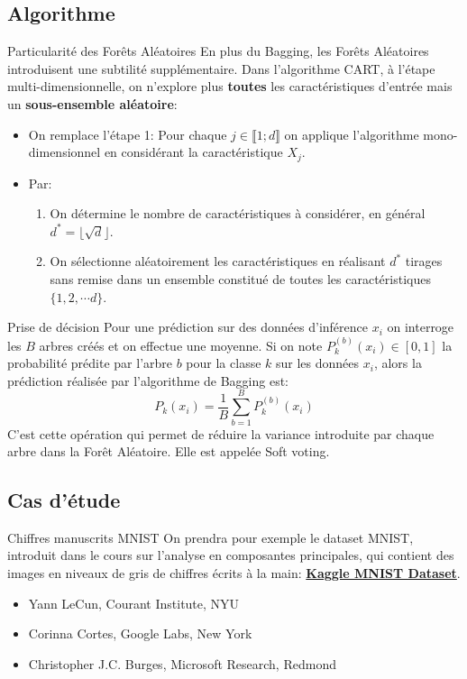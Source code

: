 \subsection[Algorithme]{Algorithme}

\begin{frame}{Particularité des Forêts Aléatoires}
	En plus du Bagging, les Forêts Aléatoires introduisent une subtilité supplémentaire. Dans l'algorithme CART, à l'étape multi-dimensionnelle, on n'explore plus \textbf{toutes} les caractéristiques d'entrée mais un \textbf{sous-ensemble aléatoire}:
	\begin{itemize}
		\item On remplace l'étape 1: Pour chaque $j \in \llbracket 1;d \rrbracket$ on applique l'algorithme mono-dimensionnel en considérant la caractéristique $X_j$.
		\item Par:
		\begin{enumerate}
			\item On détermine le nombre de caractéristiques à considérer, en général $d^* = \lfloor \sqrt{d} \rfloor$.
			\item On sélectionne aléatoirement les caractéristiques en réalisant $d^*$ tirages sans remise dans un ensemble constitué de toutes les caractéristiques $\{1, 2, \cdots d\}$.
		\end{enumerate}
	\end{itemize}
\end{frame}

\begin{frame}{Prise de décision}
	Pour une prédiction sur des données d'inférence $x_i$ on interroge les $B$ arbres créés et on effectue une moyenne. Si on note $P_k^{(b)}(x_i) \in [0, 1]$ la probabilité prédite par l'arbre $b$ pour la classe $k$ sur les données $x_i$, alors la prédiction réalisée par l'algorithme de Bagging est:
	\begin{equation*}
		P_k(x_i) = \frac{1}{B} \sum_{b=1}^B P_k^{(b)}(x_i)
	\end{equation*}
	C'est cette opération qui permet de réduire la variance introduite par chaque arbre dans la Forêt Aléatoire. Elle est appelée Soft voting.
\end{frame}


\subsection[Cas d'étude]{Cas d'étude}

\begin{frame}{Chiffres manuscrits MNIST}
	On prendra pour exemple le dataset MNIST, introduit dans le cours sur l'analyse en composantes principales, qui contient des images en niveaux de gris de chiffres écrits à la main: \href{https://www.kaggle.com/datasets/hojjatk/mnist-dataset}{\textbf{Kaggle MNIST Dataset}}.
	\begin{itemize}
		\item Yann LeCun, Courant Institute, NYU
		\item Corinna Cortes, Google Labs, New York
		\item Christopher J.C. Burges, Microsoft Research, Redmond
	\end{itemize}
\end{frame}

